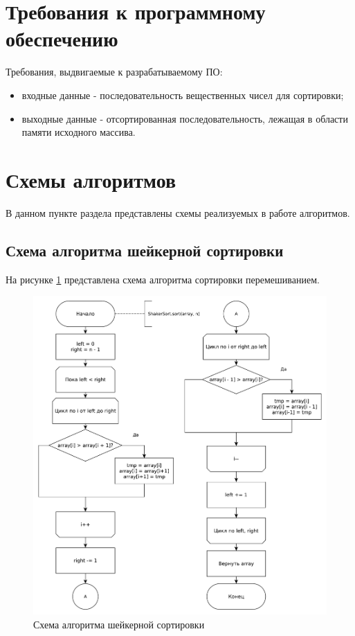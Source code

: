 \documentclass[a4paper,oneside,14pt]{extreport}
\begin{document}
\section{Требования к программному обеспечению}
Требования, выдвигаемые к разрабатываемому ПО:
\begin{itemize}
	\item входные данные - последовательность вещественных чисел для сортировки;
	\item выходные данные - отсортированная последовательность, лежащая в области памяти исходного массива.
\end{itemize}

\section{Схемы алгоритмов}
В данном пункте раздела представлены схемы реализуемых в работе алгоритмов.

\subsection{Схема алгоритма шейкерной сортировки}
На рисунке \ref{fig:Shaker} представлена схема алгоритма сортировки перемешиванием.

\begin{figure}[H]
	\centering
	\includegraphics[width=1.01\linewidth]{images/ShakerSort}
	\caption{Схема алгоритма шейкерной сортировки}
	\label{fig:Shaker}
\end{figure}
\end{document}
